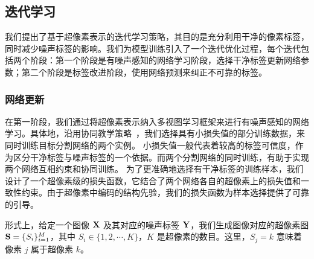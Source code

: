 \subsection{迭代学习} \label{sec:p2_2}
我们提出了基于超像素表示的迭代学习策略，其目的是充分利用干净的像素标签，同时减少噪声标签的影响。我们为模型训练引入了一个迭代优化过程，每个迭代包括两个阶段：第一个阶段是有噪声感知的网络学习阶段，选择干净标签更新网络参数；第二个阶段是标签改进阶段，使用网络预测来纠正不可靠的标签。

\subsubsection{网络更新}

在第一阶段，我们通过将超像素表示纳入多视图学习框架来进行有噪声感知的网络学习。具体地，沿用协同教学策略~\citep{ren2018learning, jiang2018mentornet, Han2018CoteachingRT}，我们选择具有小损失值\citep{arpit2017closer}的部分训练数据，来同时训练目标分割网络的两个实例。
小损失值一般代表着较高的标签可信度，作为区分干净标签与噪声标签的一个依据。而两个分割网络的同时训练，有助于实现两个网络互相约束和协同训练。
为了更准确地选择有干净标签的训练样本，我们设计了一个超像素级的损失函数，它结合了两个网络各自的超像素上的损失值和一致性约束\citep{Wei2020CombatingNL}。由于超像素中编码的结构先验，我们的损失函数为样本选择提供了可靠的引导。

形式上，给定一个图像 $\mathbf{X}$ 及其对应的噪声标签 $\mathbf{Y}$，我们生成图像对应的超像素图 $\mathbf{S} =\{S_i\}_{i=1}^M$，其中 $S_i\in\{1,2,\cdots, K\}$，$K$ 是超像素的数目。这里，$S_j=k$ 意味着像素 $j$ 属于超像素 $k$。

